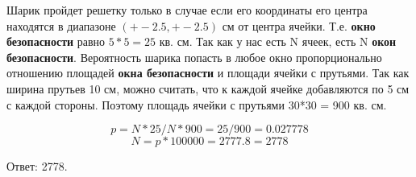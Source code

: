 \solutionSection
Шарик пройдет решетку только в случае если его координаты его центра находятся в диапазоне $(+-2.5, +-2.5)$ см от центра ячейки. Т.е. \textbf{окно безопасности} равно $5*5 = 25$ кв. см. Так как у нас есть N ячеек, есть N \textbf{окон безопасности}. Вероятность шарика попасть в любое окно пропорционально отношению площадей \textbf{окна безопасности} и площади ячейки с прутьями. Так как ширина прутьев 10 см, можно считать, что к каждой ячейке добавляются по 5 см с каждой стороны. Поэтому площадь ячейки с прутьями 30*30 = 900 кв. см. 

\[p = N * 25 / N * 900 = 25 / 900 = 0.027778\]
\[N = p * 100000  = 2777.8 = 2778\]

Ответ: 2778.

